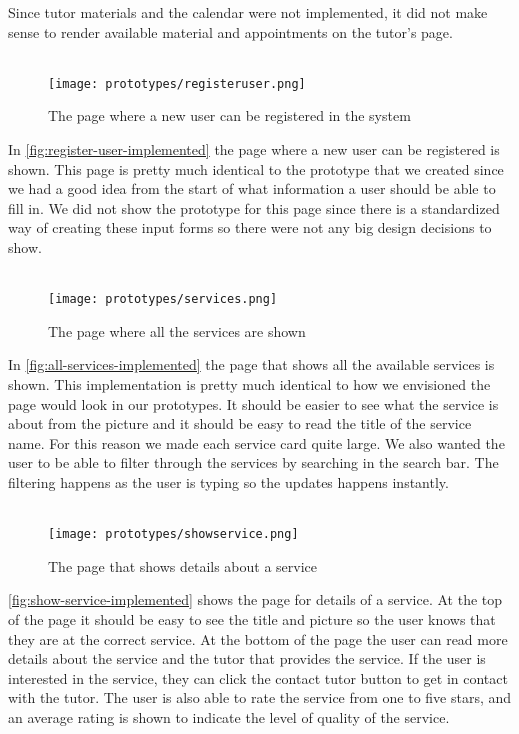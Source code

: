 Since tutor materials and the calendar were not implemented, it did not make sense to render available material and appointments on the tutor's page.
\\\\
\begin{figure}
    \centering
    \texttt{[image: prototypes/registeruser.png]} 
    \caption{The page where a new user can be registered in the system}
    \label{fig:register-user-implemented}
\end{figure}
\noindent
In \autoref{fig:register-user-implemented} the page where a new user can be registered is shown.
This page is pretty much identical to the prototype that we created since we had a good idea from the start of what information a user should be able to fill in. 
We did not show the prototype for this page since there is a standardized way of creating these input forms so there were not any big design decisions to show.
\\\\
\begin{figure}
    \centering
    \texttt{[image: prototypes/services.png]}
    \caption{The page where all the services are shown}
    \label{fig:all-services-implemented}
\end{figure}
\noindent
In \autoref{fig:all-services-implemented} the page that shows all the available services is shown. 
This implementation is pretty much identical to how we envisioned the page would look in our prototypes. 
It should be easier to see what the service is about from the picture and it should be easy to read the title of the service name.
For this reason we made each service card quite large.
We also wanted the user to be able to filter through the services by searching in the search bar. 
The filtering happens as the user is typing so the updates happens instantly.
\\\\
\begin{figure}
    \centering
    \texttt{[image: prototypes/showservice.png]} 
    \caption{The page that shows details about a service}
    \label{fig:show-service-implemented}
\end{figure}
\noindent
\autoref{fig:show-service-implemented} shows the page for details of a service.
At the top of the page it should be easy to see the title and picture so the user knows that they are at the correct service.
At the bottom of the page the user can read more details about the service and the tutor that provides the service.
If the user is interested in the service, they can click the contact tutor button to get in contact with the tutor.
The user is also able to rate the service from one to five stars, and an average rating is shown to indicate the level of quality of the service.
